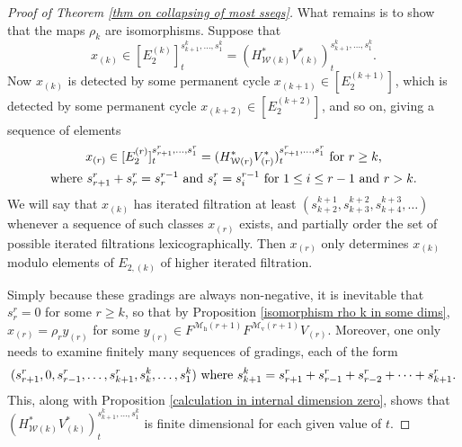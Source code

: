 \documentclass[11pt]{amsart} \renewcommand{\baselinestretch}{1.2}
\theoremstyle{plain}
\numberwithin{equation}{section} %
\theoremstyle{plain}
\numberwithin{equation}{chapter} %
\newcommand{\calw}{\mathcal{W}}
\newcommand{\calMv}{\mathcal{M}\dver}
\newcommand{\calMh}{\mathcal{M}\dhor}
\newcommand{\E}[5]{[E^{#1}_{#2}#3]^{#4}_{#5}}
\newcommand{\dver}{_\mathrm{v}}
\newcommand{\dhor}{_\mathrm{h}}
\begin{document}
\begin{Calculations of HWn}
\begin{proof}[Proof of Theorem \ref{thm on collapsing of most sseqs}]
What remains is to show that the maps $\rho_k$ are isomorphisms. Suppose that 
\[x_{(k)}\in \E{(k)}{2}{}{{s_{k+1}^{k},\ldots,s_1^{k}}}{t}=(H^*_{\calw(k)}V^*_{(k)})^{s_{k+1}^{k},\ldots,s_1^{k}}_t.\]
Now $x_{(k)}$ is detected by some permanent cycle $x_{(k+1)}\in \E{(k+1)}{2}{}{}{}$, which is detected by some permanent cycle $x_{(k+2)}\in \E{(k+2)}{2}{}{}{}$, and so on, giving a sequence of elements
\begin{gather*}
x_{(r)}\in \E{(r)}{2}{}{s_{r+1}^{r},\ldots,s_1^{r}}{t}=(H^*_{\calw(r)}V^*_{(r)})^{s_{r+1}^{r},\ldots,s_1^{r}}_t\textup{ for $r\geq k$,}\\
\textup{where }s^{r}_{r+1}+s^{r}_{r}=s^{r-1}_{r}\textup{ and }s^{r}_{i}=s^{r-1}_{i}\textup{  for $1\leq i\leq r-1$ and $r>k$}.
\end{gather*}
We will say that $x_{(k)}$ has iterated filtration at least $(s^{k+1}_{k+2},s^{k+2}_{k+3},s^{k+3}_{k+4},\ldots)$ whenever a sequence of such classes $x_{(r)}$ exists, and partially order the set of possible iterated filtrations lexicographically. Then $x_{(r)}$ only determines $x_{(k)}$ modulo elements of $E_{2,(k)}$ of higher iterated filtration.

Simply because these gradings are always non-negative, it is inevitable that $s_r^r=0$ for some $r\geq k$, so that by Proposition \ref{isomorphism rho k in some dims}, $x_{(r)}=\rho_ry_{(r)}$ for some $y_{(r)}\in F^{\calMh(r+1)}F^{\calMv(r+1)}V_{(r)}$. Moreover, one only needs to examine finitely many sequences of gradings, each of the form
\[(s^r_{r+1},0,s^{r}_{r-1},\ldots, s^{r}_{k+1},s^k_{k},\ldots,s^k_1)\textup{ where }s^k_{k+1}=s^r_{r+1}+s^{r}_{r-1}+s^{r}_{r-2}+\cdots +s^{r}_{k+1}.\]
This, along with Proposition \ref{calculation in internal dimension zero}, shows that $(H^*_{\calw(k)}V^*_{(k)})^{s_{k+1}^{k},\ldots,s_1^{k}}_t$ is finite dimensional for each given value of $t$.




\end{proof}
\end{Calculations of HWn}
\end{document}
